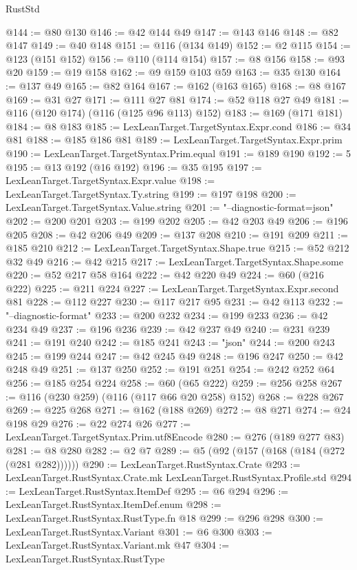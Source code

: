 \begin{lexlean}{RustStd}
\begin{coremodule}
@144 := @80 @130
@146 := @42 @144 @49
@147 := @143 @146
@148 := @82 @147
@149 := @40 @148
@151 := @116 (@134 @149)
@152 := @2 @115
@154 := @123 (@151 @152)
@156 := @110 (@114 @154)
@157 := @8 @156
@158 := @93 @20
@159 := @19 @158
@162 := @9 @159 @103 @59
@163 := @35 @130
@164 := @137 @49
@165 := @82 @164
@167 := @162 (@163 @165)
@168 := @8 @167
@169 := @31 @27
@171 := @111 @27 @81
@174 := @52 @118 @27 @49
@181 := @116 (@120 @174) (@116 (@125 @96 @113) @152)
@183 := @169 (@171 @181)
@184 := @8 @183
@185 := LexLeanTarget.TargetSyntax.Expr.cond
@186 := @34 @81
@188 := @185 @186 @81
@189 := LexLeanTarget.TargetSyntax.Expr.prim
@190 := LexLeanTarget.TargetSyntax.Prim.equal
@191 := @189 @190
@192 := 5
@195 := @13 @192 (@16 @192)
@196 := @35 @195
@197 := LexLeanTarget.TargetSyntax.Expr.value
@198 := LexLeanTarget.TargetSyntax.Ty.string
@199 := @197 @198
@200 := LexLeanTarget.TargetSyntax.Value.string
@201 := "--diagnostic-format=json"
@202 := @200 @201
@203 := @199 @202
@205 := @42 @203 @49
@206 := @196 @205
@208 := @42 @206 @49
@209 := @137 @208
@210 := @191 @209
@211 := @185 @210
@212 := LexLeanTarget.TargetSyntax.Shape.true
@215 := @52 @212 @32 @49
@216 := @42 @215
@217 := LexLeanTarget.TargetSyntax.Shape.some
@220 := @52 @217 @58 @164
@222 := @42 @220 @49
@224 := @60 (@216 @222)
@225 := @211 @224
@227 := LexLeanTarget.TargetSyntax.Expr.second @81
@228 := @112 @227
@230 := @117 @217 @95
@231 := @42 @113
@232 := "--diagnostic-format"
@233 := @200 @232
@234 := @199 @233
@236 := @42 @234 @49
@237 := @196 @236
@239 := @42 @237 @49
@240 := @231 @239
@241 := @191 @240
@242 := @185 @241
@243 := "json"
@244 := @200 @243
@245 := @199 @244
@247 := @42 @245 @49
@248 := @196 @247
@250 := @42 @248 @49
@251 := @137 @250
@252 := @191 @251
@254 := @242 @252 @64
@256 := @185 @254 @224
@258 := @60 (@65 @222)
@259 := @256 @258
@267 := @116 (@230 @259) (@116 (@117 @66 @20 @258) @152)
@268 := @228 @267
@269 := @225 @268
@271 := @162 (@188 @269)
@272 := @8 @271
@274 := @24 @198 @29
@276 := @22 @274 @26
@277 := LexLeanTarget.TargetSyntax.Prim.utf8Encode
@280 := @276 (@189 @277 @83)
@281 := @8 @280
@282 := @2 @7
@289 := @5 (@92 (@157 (@168 (@184 (@272 (@281 @282))))))
@290 := LexLeanTarget.RustSyntax.Crate
@293 := LexLeanTarget.RustSyntax.Crate.mk LexLeanTarget.RustSyntax.Profile.std
@294 := LexLeanTarget.RustSyntax.ItemDef
@295 := @6 @294
@296 := LexLeanTarget.RustSyntax.ItemDef.enum
@298 := LexLeanTarget.RustSyntax.RustType.fn @18
@299 := @296 @298
@300 := LexLeanTarget.RustSyntax.Variant
@301 := @6 @300
@303 := LexLeanTarget.RustSyntax.Variant.mk @47
@304 := LexLeanTarget.RustSyntax.RustType

\end{coremodule}
\end{lexlean}
